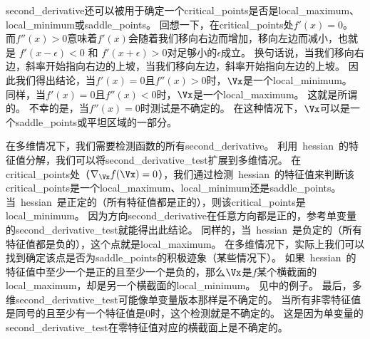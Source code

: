 \gls{second_derivative}还可以被用于确定一个\gls{critical_points}是否是\gls{local_maximum}、\gls{local_minimum}或\gls{saddle_points}。
回想一下，在\gls{critical_points}处$f'(x) = 0$。
而$f''(x) > 0$意味着$f'(x)$会随着我们移向右边而增加，移向左边而减小，也就是 $f'(x - \epsilon) < 0$ 和 $f'(x+\epsilon)>0$对足够小的$\epsilon$成立。 换句话说，当我们移向右边，斜率开始指向右边的上坡，当我们移向左边，斜率开始指向左边的上坡。
因此我们得出结论，当$f'(x) = 0$且$f''(x) > 0$时，$\Vx$是一个\gls{local_minimum}。
同样，当$f'(x) = 0$且$f''(x) < 0$时，$\Vx$是一个\gls{local_maximum}。
这就是所谓的。
不幸的是，当$f''(x) = 0$时测试是不确定的。
在这种情况下，$\Vx$可以是一个\gls{saddle_points}或平坦区域的一部分。


在多维情况下，我们需要检测函数的所有\gls{second_derivative}。
利用~\gls{hessian}~的特征值分解，我们可以将\gls{second_derivative_test}扩展到多维情况。
在\gls{critical_points}处（$\nabla_{\Vx} f(\Vx) = 0$），我们通过检测~\gls{hessian}~的特征值来判断该\gls{critical_points}是一个\gls{local_maximum}、\gls{local_minimum}还是\gls{saddle_points}。
当~\gls{hessian}~是正定的（所有特征值都是正的），则该\gls{critical_points}是\gls{local_minimum}。
因为方向\gls{second_derivative}在任意方向都是正的，参考单变量的\gls{second_derivative_test}就能得出此结论。
同样的，当~\gls{hessian}~是负定的（所有特征值都是负的），这个点就是\gls{local_maximum}。
在多维情况下，实际上我们可以找到确定该点是否为\gls{saddle_points}的积极迹象（某些情况下）。
如果~\gls{hessian}~的特征值中至少一个是正的且至少一个是负的，那么$\Vx$是$f$某个横截面的\gls{local_maximum}，却是另一个横截面的\gls{local_minimum}。
见中的例子。
最后，多维\gls{second_derivative_test}可能像单变量版本那样是不确定的。
当所有非零特征值是同号的且至少有一个特征值是$0$时，这个检测就是不确定的。
这是因为单变量的\gls{second_derivative_test}在零特征值对应的横截面上是不确定的。
